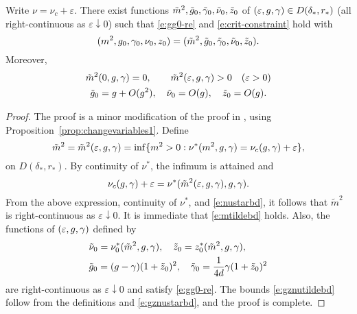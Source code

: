 \begin{prop}
\label{prop:changevariables2}
Write $\nu = \nu_c + \varepsilon$.
There exist functions $\tilde m^2, \tilde {g}_0, \tilde\gamma_0, \tilde\nu_0, \tilde z_0$
of $(\varepsilon, g, \gamma) \in D(\delta_*, r_*)$
(all right-continuous as $\varepsilon\downarrow 0$)
such that \eqref{e:gg0-re} and \eqref{e:crit-constraint} hold with
\begin{equation}
(m^2, g_0, \gamma_0, \nu_0, z_0) = (\tilde m^2, \tilde {g}_0, \tilde\gamma_0, \tilde\nu_0, \tilde z_0).
\end{equation}
Moreover,
\begin{gather}
\label{e:mtildebd}
\tilde m^2(0, g, \gamma) = 0,
		\qquad
\tilde m^2(\varepsilon, g, \gamma) > 0
		\quad
(\varepsilon > 0) \\
\label{e:gznutildebd}
\tilde {g}_0 = g + O(g^2),
		\quad
\tilde \nu_0 = O(g),
		\quad
\tilde z_0 = O(g).
\end{gather}
\end{prop}

\begin{proof}
The proof is a minor modification of the proof in \cite{BBS-saw4-log},
using Proposition~\ref{prop:changevariables1}.
Define
\begin{equation}
\label{e:mtildef}
\tilde m^2
		=
\tilde m^2 (\varepsilon,g,\gamma)
		=
\inf \{m^2 > 0 : \nu^*(m^2, g, \gamma) = \nu_c(g, \gamma) + \varepsilon \},
\end{equation}
on $D(\delta_*, r_*)$. By continuity of $\nu^*$, the infimum is attained and
\begin{equation}
\nu_c(g, \gamma) + \varepsilon
	=
\nu^*(\tilde m^2(\varepsilon, g, \gamma), g, \gamma).
\end{equation}
From the above expression, continuity of $\nu^*$, and \eqref{e:nustarbd},
it follows that $\tilde m^2$ is right-continuous as $\varepsilon\downarrow 0$.
It is immediate that \eqref{e:mtildebd} holds.
Also, the functions of $(\varepsilon,g,\gamma)$ defined by
\begin{align}
&\tilde\nu_0 = \nu_0^*(\tilde m^2, g, \gamma),
	\quad
\tilde z_0 = z_0^*(\tilde m^2, g, \gamma),
	\\
&\tilde {g}_0 = (g - \gamma) (1 + \tilde z_0)^2,
	\quad
\tilde\gamma_0 = \frac{1}{4d} \gamma (1 + \tilde z_0)^2
\end{align}
are right-continuous as $\varepsilon \downarrow 0$ and satisfy \eqref{e:gg0-re}.
The bounds \eqref{e:gznutildebd} follow from the definitions
and \eqref{e:gznustarbd}, and the proof is complete.
\end{proof}

